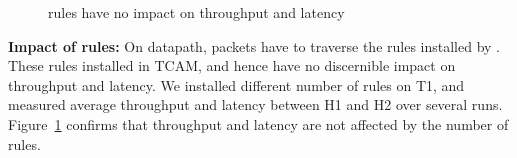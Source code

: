 \begin{figure}[t]
	\centering
	
	\caption{\sysname{} rules have no impact on throughput and latency}
	\label{fig:perf_penalty}
\end{figure}

\textbf{Impact of \sysname{} rules:} On datapath, packets have to traverse the rules installed by \sysname{}.  These
rules installed in TCAM, and hence have no discernible impact on throughput and
latency. We installed different number of \sysname{} rules on T1, and measured
average throughput and latency between H1 and H2 over several runs.
Figure~\ref{fig:perf_penalty} confirms that throughput and latency are not
affected by the number of rules.





